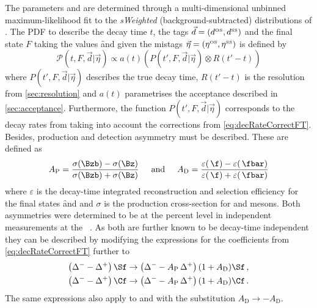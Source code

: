 The \CP parameters \Sf and \Sfbar are determined through a multi-dimensional unbinned maximum-likelihood fit to the \emph{sWeighted} (background-subtracted) distributions of \BdToDpi.
The PDF to describe the decay time $t$, the tags $\vec{d}=(d^{\text{\tiny OS}}, d^{\text{\tiny SS}})$ and the final state $F$ taking the values \f and \fbar given the mistags $\vec{\eta}=(\eta^{\text{\tiny OS}}, \eta^{\text{\tiny SS}})$ is defined by
\begin{equation}
\mathcal{P}(t, F, \vec{d}|\vec{\eta})\propto a(t)\left(P(t', F, \vec{d}|\vec{\eta})\otimes R(t'-t)\right)\label{eq:FinalDecayTimePDF}
\end{equation}
where $P(t', F, \vec{d}|\vec{\eta})$ describes the true decay time, $R(t'-t)$ is the resolution from \cref{sec:resolution} and $a(t)$ parametrises the acceptance described in \cref{sec:acceptance}.
Furthermore, the function $P(t', F, \vec{d}|\vec{\eta})$ corresponds to the decay rates from  taking into account the corrections from \cref{eq:decRateCorrectFT}.
Besides, production and detection asymmetry must be described.
These are defined as
\begin{equation}
A_{\text{P}}=\frac{\sigma(\Bzb)-\sigma(\Bz)}{\sigma(\Bzb)+\sigma(\Bz)}\hspace{0.5cm}\text{and}\hspace{0.5cm}A_{\text{D}}=\frac{\varepsilon(\,\f)-\varepsilon(\,\fbar)}{\varepsilon(\,\f)+\varepsilon(\,\fbar)}
\end{equation}
where $\varepsilon$ is the decay-time integrated reconstruction and selection efficiency for the final states \f and \fbar and $\sigma$ is the production cross-section for \Bz and \Bzb mesons.
Both asymmetries were determined to be at the percent level in independent measurements at the \lhc~\cite{Aaij:2017mso}.
As both are further known to be decay-time independent they can be described by modifying the expressions for the \CP coefficients from \cref{eq:decRateCorrectFT} further to
\begin{equation}
\begin{aligned}
\left(\Delta^--\Delta^+\right)\Sf&\to\left(\Delta^--A_{\text{P}}\,\Delta^+\right)(1+A_{\text{D}})\Sf\,,\\
\left(\Delta^--\Delta^+\right)\Cf&\to\left(\Delta^--A_{\text{P}}\,\Delta^+\right)(1+A_{\text{D}})\Cf\,.
\end{aligned}
\end{equation}
The same expressions also apply to \Sfbar and \Cfbar with the substitution $A_{\text{D}}\to -A_{\text{D}}$.

